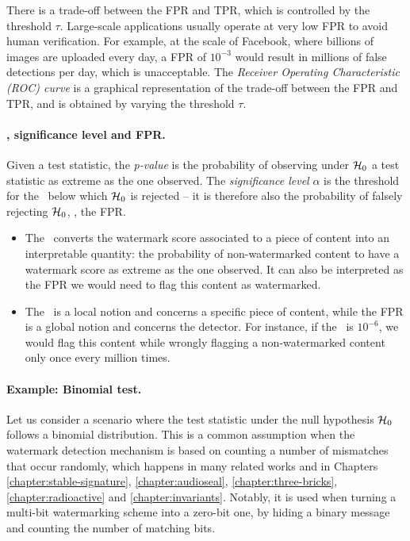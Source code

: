 There is a trade-off between the FPR and TPR, which is controlled by the threshold $\tau$. 
Large-scale applications usually operate at very low FPR to avoid human verification.
For example, at the scale of Facebook, where billions of images are uploaded every day, a FPR of $10^{-3}$ would result in millions of false detections per day, which is unacceptable.
The \emph{Receiver Operating Characteristic (\Gls*{ROC}) curve} is a graphical representation of the trade-off between the FPR and TPR, and is obtained by varying the threshold $\tau$.

\paragraph*{\pval, significance level and FPR.}
Given a test statistic, the \emph{\gls*{p-value}} is the probability of observing under $\mathcal{H}_0$ a test statistic as extreme as the one observed.
The \emph{significance level} $\alpha$ is the threshold for the \pval\ below which $\mathcal{H}_0$ is rejected -- it is therefore also the probability of falsely rejecting $\mathcal{H}_0$, \ie, the FPR.
\begin{itemize}
    \item The \pval\ converts the watermark score associated to a piece of content into an interpretable quantity: the probability of non-watermarked content to have a watermark score as extreme as the one observed.
    It can also be interpreted as the FPR we would need to flag this content as watermarked.
    \item The \pval\ is a local notion and concerns a specific piece of content, while the FPR is a global notion and concerns the detector.
    For instance, if the \pval\ is $10^{-6}$, we would flag this content while wrongly flagging a non-watermarked content only once every million times.
\end{itemize}

\paragraph*{Example: Binomial test.}
Let us consider a scenario where the test statistic under the null hypothesis $\mathcal{H}_0$ follows a binomial distribution. This is a common assumption when the watermark detection mechanism is based on counting a number of mismatches that occur randomly, which happens in many related works and in Chapters \ref{chapter:stable-signature}, \ref{chapter:audioseal}, \ref{chapter:three-bricks}, \ref{chapter:radioactive} and \ref{chapter:invariants}.
Notably, it is used when turning a multi-bit watermarking scheme into a zero-bit one, by hiding a binary message and counting the number of matching bits.

